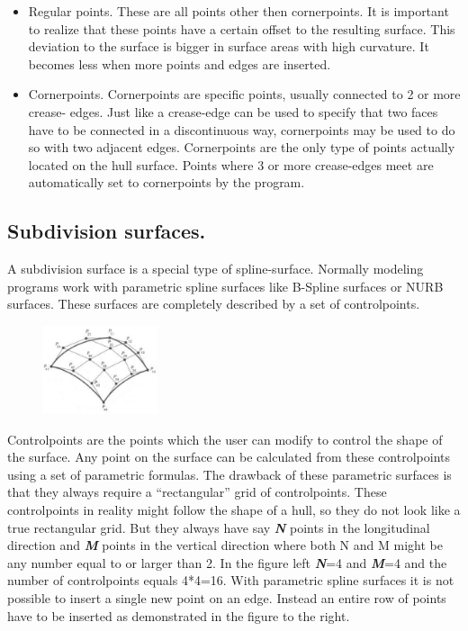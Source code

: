 \documentclass[12pt]{article}
\begin{document}
\begin{itemize}
  \item Regular points. These are all points other then cornerpoints. It is important to realize that
these points have a certain offset to the resulting surface. This deviation to the surface is
bigger in surface areas with high curvature. It becomes less when more points and edges
are inserted.
  \item Cornerpoints. Cornerpoints are specific points, usually connected to 2 or more crease-
edges. Just like a crease-edge can be used to specify that two faces have to be connected
in a discontinuous way, cornerpoints may be used to do so with two adjacent edges.
Cornerpoints are the only type of points actually located on the hull surface. Points where 3
or more crease-edges meet are automatically set to cornerpoints by the program.
\end{itemize}

\subsection{Subdivision surfaces.}

A subdivision surface is a special type of spline-surface. Normally
modeling programs work with parametric spline surfaces like B-Spline
surfaces or NURB surfaces. These surfaces are completely described by
a set of controlpoints.

\begin{figure}
        \centering
        \includegraphics[width=0.3\textwidth,natwidth=311,natheight=240]{figure2.png}
        \caption{}
        \label{fig:mesh1}
\end{figure}

Controlpoints are the points which the user can modify to control the
shape of the surface. Any point on the surface can be calculated from
these controlpoints using a set of parametric formulas. The drawback
of these parametric surfaces is that they always require a
“rectangular” grid of controlpoints. These controlpoints in reality
might follow the shape of a hull, so they do not look like a true
rectangular grid. But they always have say \textit{\textbf{N}} points
in the longitudinal direction and \textit{\textbf{M}} points in the
vertical direction where both N and M might be any number equal to or
larger than 2. In the figure left \textit{\textbf{N}}=4
and \textit{\textbf{M}}=4 and the number of controlpoints equals
4*4=16. With parametric spline surfaces it is not possible to insert a
single new point on an edge. Instead an entire row of points have to
be inserted as demonstrated in the figure to the right.
\end{document}
